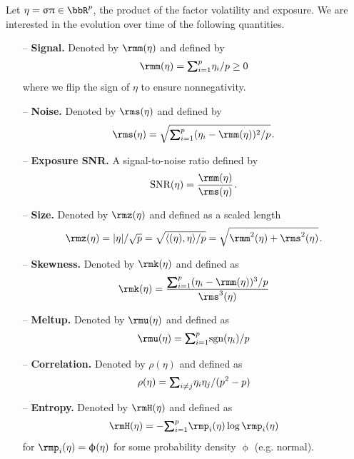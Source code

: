 \documentclass[leqno,12pt]{article}
\begin{document}
{\begin{mdframed}[style=clean]
  Let $\eta = \upsigma \uppi \in \bbR^p$, the product of the 
factor volatility and exposure. We are interested in the 
evolution over time of the following quantities.
\begin{itemize}
  \item[--] {\bf Signal.} Denoted by $\rmm(\eta)$ and 
defined by
\begin{align}
  \rmm(\eta) = \tsum_{i=1}^p \eta_i/p \ge 0
\end{align}
where we flip the sign of $\eta$ to ensure nonnegativity.
  \item[--] {\bf Noise.} Denoted by $\rms(\eta)$
and defined by 
\begin{align}
\rms(\eta) = \sqrt{\tsum_{i=1}^p 
(\eta_i-\rmm(\eta))^2/p} \s .
\end{align}
\item[--] {\bf Exposure SNR.} A signal-to-noise ratio defined by
\begin{align}
  \text{SNR}(\eta) = \frac{\rmm(\eta)}{\rms(\eta)} \s .
\end{align}
  \item[--] {\bf Size.} Denoted by $\rmz(\eta)$ and defined
as a scaled length
\begin{align}
  \rmz(\eta) = |\eta|/\sqrt{p} = \sqrt{\ip{(\eta)}{\eta}/p}
  = \sqrt{\rmm^2(\eta) + \rms^2(\eta)} \s .
\end{align}
\item[--] {\bf Skewness.} Denoted by $\rmk(\eta)$ and 
defined as
\begin{align}
 \rmk(\eta) = \frac{\tsum_{i=1}^p (\eta_i - \rmm(\eta))^3/p}
 {\rms^3(\eta) }
\end{align}
\item[--] {\bf Meltup.} Denoted by $\rmu(\eta)$ and 
defined as
\begin{align}
   \rmu(\eta) = \tsum_{i=1}^p \text{sgn}(\eta_i)/p
\end{align}
\item[--] {\bf Correlation.} Denoted by $\rho(\eta)$ and 
defined as
\begin{align}
   \rho(\eta) = \tsum_{i\neq j} \eta_i \eta_j/(p^2-p)
\end{align}
\item[--] {\bf Entropy.}
Denoted by $\rmH(\eta)$ and defined as
\begin{align}  
   \rmH(\eta) = -\tsum_{i=1}^p \rmp_i(\eta) \log \rmp_i(\eta)
\end{align}
for $\rmp_i(\eta) = \upphi(\eta)$ for some probability
density $\upphi$ (e.g. normal).
\end{itemize} 
\end{mdframed}

}
\end{document}
